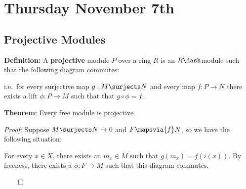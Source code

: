 \hypertarget{thursday-november-7th}{%
\section{Thursday November 7th}\label{thursday-november-7th}}

\hypertarget{projective-modules}{%
\subsection{Projective Modules}\label{projective-modules}}

\textbf{Definition:} A \textbf{projective} module \(P\) over a ring
\(R\) is an \(R\dash\)module such that the following diagram commutes:

\begin{center}
\end{center}

i.e.~for every surjective map \(g:M \surjects N\) and every map
\(f: P \to N\) there exists a lift \(\phi: P \to M\) such that that
\(g \circ \phi = f\).

\textbf{Theorem}: Every free module is projective.

\emph{Proof:} Suppose \(M \surjects N \to 0\) and \(F \mapsvia{f} N\),
so we have the following situation:

\begin{center}
\end{center}

For every \(x\in X\), there exists an \(m_x \in M\) such that
\(g(m_x) = f(i(x))\). By freeness, there exists a \(\phi: F \to M\) such
that this diagram commutes.

\(\qed\)

